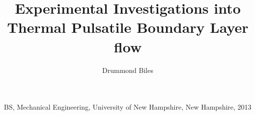 
\title{Experimental Investigations into Thermal Pulsatile Boundary Layer flow}

\author{Drummond Biles}

\prevdegrees
{
    BS, Mechanical Engineering, University of New Hampshire, New Hampshire, 2013
}





\thesisdate{\today}

\frontmatter

\maketitle
